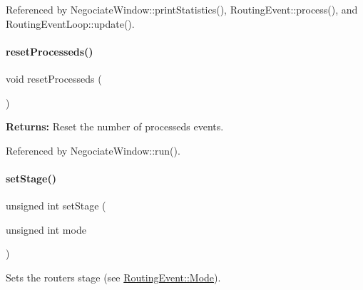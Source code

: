 Referenced by Negociate\+Window\+::print\+Statistics(), Routing\+Event\+::process(), and Routing\+Event\+Loop\+::update().

\mbox{\label{classKite_1_1RoutingEvent_a6cf10bb4e4488948e4c616c55a8e6514}} 
\paragraph{\texorpdfstring{reset\+Processeds()}{resetProcesseds()}}
{\footnotesize\ttfamily void reset\+Processeds (\begin{DoxyParamCaption}{ }\end{DoxyParamCaption})\hspace{0.3cm}{\ttfamily [static]}}

{\bfseries Returns\+:} Reset the number of processeds events. 

Referenced by Negociate\+Window\+::run().

\mbox{\label{classKite_1_1RoutingEvent_a7300c33d439e453796b170eeaf4bf04d}} 
\paragraph{\texorpdfstring{set\+Stage()}{setStage()}}
{\footnotesize\ttfamily unsigned int set\+Stage (\begin{DoxyParamCaption}\item[{unsigned int}]{mode }\end{DoxyParamCaption})\hspace{0.3cm}{\ttfamily [static]}}

Sets the router\textquotesingle{}s stage (see \mbox{\hyperlink{classKite_1_1RoutingEvent_a46c8a310cf4c094f8c80e1cb8dc1f911}{Routing\+Event\+::\+Mode}}). \mbox{\label{classKite_1_1RoutingEvent_a131ef83c7a57a64aed4f698c0433dffa}} 
